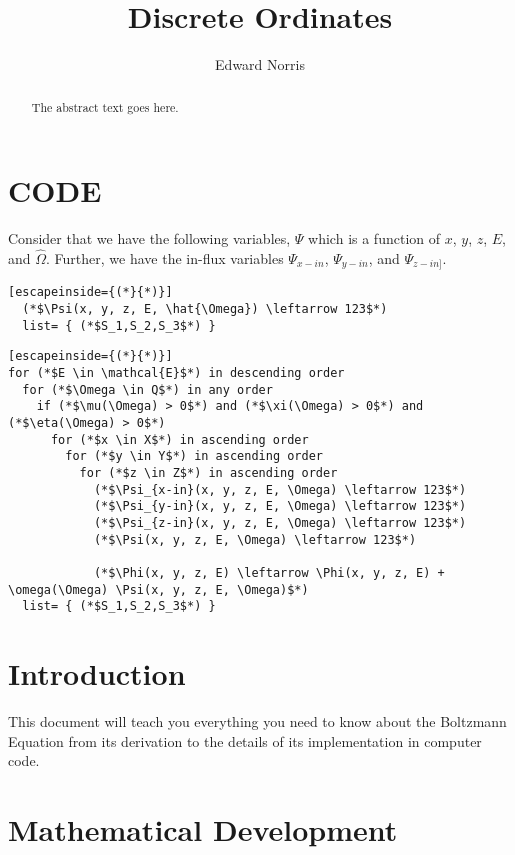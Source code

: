 \documentclass{article}
\numberwithin{equation}{subsection}
\begin{document}
\title{Discrete Ordinates}
\author{Edward Norris}

\maketitle

\begin{abstract}
The abstract text goes here.
\end{abstract}

\tableofcontents

\section{CODE}
Consider that we have the following variables, $\Psi$ which is a function of $x$, $y$, $z$, $E$, and $\hat{\Omega}$. Further, we have the in-flux variables $\Psi_{x-in}$, $\Psi_{y-in}$, and $\Psi_{z-in]}$. 

\begin{lstlisting}[escapeinside={(*}{*)}]
  (*$\Psi(x, y, z, E, \hat{\Omega}) \leftarrow 123$*)
  list= { (*$S_1,S_2,S_3$*) }
\end{lstlisting}

\begin{lstlisting}[escapeinside={(*}{*)}]
for (*$E \in \mathcal{E}$*) in descending order
  for (*$\Omega \in Q$*) in any order
    if (*$\mu(\Omega) > 0$*) and (*$\xi(\Omega) > 0$*) and (*$\eta(\Omega) > 0$*)
      for (*$x \in X$*) in ascending order
        for (*$y \in Y$*) in ascending order
          for (*$z \in Z$*) in ascending order
            (*$\Psi_{x-in}(x, y, z, E, \Omega) \leftarrow 123$*)
            (*$\Psi_{y-in}(x, y, z, E, \Omega) \leftarrow 123$*)
            (*$\Psi_{z-in}(x, y, z, E, \Omega) \leftarrow 123$*)
            (*$\Psi(x, y, z, E, \Omega) \leftarrow 123$*)
            
            (*$\Phi(x, y, z, E) \leftarrow \Phi(x, y, z, E) + \omega(\Omega) \Psi(x, y, z, E, \Omega)$*)
  list= { (*$S_1,S_2,S_3$*) }
\end{lstlisting}

\section{Introduction}
This document will teach you everything you need to know about the Boltzmann Equation from its derivation to the details of its implementation in computer code.

\section{Mathematical Development}
\end{document}
